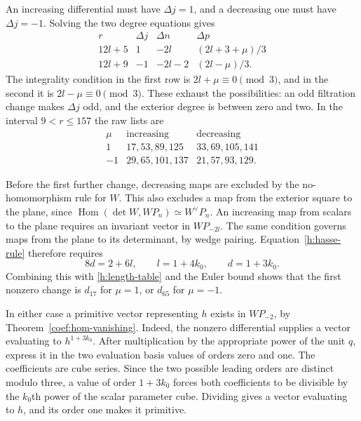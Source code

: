 \documentclass[11pt]{article}
\theoremstyle{definition}
\theoremstyle{remark}
\numberwithin{equation}{section}
\begin{document}
An increasing differential must have $\Delta j=1$, and a decreasing
one must have $\Delta j=-1$. Solving the two degree equations gives
\begin{equation}
 \label{h:degree-rules}
 \begin{array}{c|ccc}
  r&\Delta j&\Delta n&\Delta p\\\hline
  12l+5&1&-2l&(2l+3+\mu)/3\\
  12l+9&-1&-2l-2&(2l-\mu)/3.
 \end{array}
\end{equation}
The integrality condition in the first row is
$2l+\mu\equiv0\pmod3$, and in the second it is
$2l-\mu\equiv0\pmod3$. These exhaust the possibilities: an odd
filtration change makes $\Delta j$ odd, and the exterior degree is
between zero and two. In the interval $9<r\leq157$ the raw lists are
\begin{equation}
 \label{h:length-table}
 \begin{array}{c|l|l}
  \mu&\text{increasing}&\text{decreasing}\\\hline
  1&17,53,89,125&33,69,105,141\\
  -1&29,65,101,137&21,57,93,129.
 \end{array}
\end{equation}

Before the first further change, decreasing maps are excluded by the
no-homomorphism rule for $W$. This also excludes a map from the
exterior square to the plane, since
$\operatorname{Hom}(\det W,WP_n)\simeq W^{\vee}P_n$.
An increasing map from scalars to the plane requires an invariant
vector in $WP_{-2l}$. The same condition governs maps from the plane
to its determinant, by wedge pairing. Equation~\eqref{h:hasse-rule}
therefore requires
\begin{equation}
 \label{h:first-hasse-degree}
 8d=2+6l,\qquad l=1+4k_0,\qquad d=1+3k_0.
\end{equation}
Combining this with \eqref{h:length-table} and the Euler bound shows
that the first nonzero change is $d_{17}$ for $\mu=1$, or $d_{65}$
for $\mu=-1$.

In either case a primitive vector representing $h$ exists in $WP_{-2}$,
by Theorem~\ref{coef:hom-vanishing}.
Indeed, the nonzero differential supplies a vector evaluating to
$h^{1+3k_0}$. After multiplication by the appropriate power of the
unit $q$, express it in the two evaluation basis values of orders zero
and one. The coefficients are cube series. Since the two possible
leading orders are distinct modulo three, a value of order
$1+3k_0$ forces both coefficients to be divisible by the $k_0$th
power of the scalar parameter cube. Dividing gives a vector evaluating
to $h$, and its order one makes it primitive.
\end{document}
